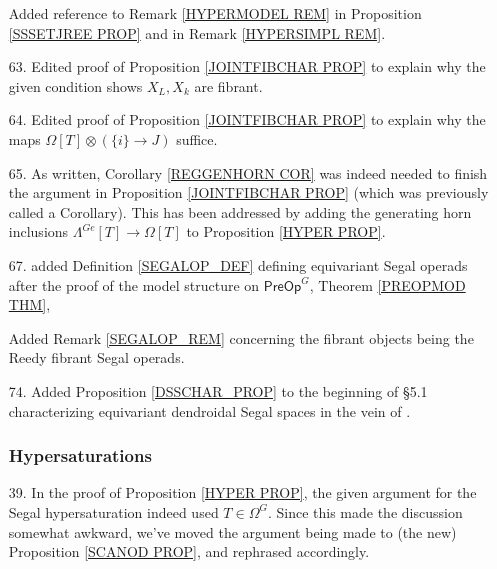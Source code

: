 \documentclass{article}
\begin{document}
\begin{itemize}
      Added reference to Remark \ref{HYPERMODEL REM} in Proposition \ref{SSSETJREE PROP} and in Remark \ref{HYPERSIMPL REM}.
      
\item[63.] Edited proof of Proposition \ref{JOINTFIBCHAR PROP} to explain why the given condition shows $X_L,X_k $ are fibrant.
      
\item[64.] Edited proof of Proposition \ref{JOINTFIBCHAR PROP} to explain why the maps $\Omega[T] \otimes (\{i\} \to J)$ suffice. %
      
\item[65.] As written, Corollary \ref{REGGENHORN COR} was indeed needed to finish the argument in Proposition \ref{JOINTFIBCHAR PROP} (which was previously called a Corollary). This has been addressed by adding the generating horn inclusions $\Lambda^{Ge}[T] \to \Omega[T]$ to Proposition \ref{HYPER PROP}. %
      
\item[67.] added Definition \ref{SEGALOP_DEF} defining equivariant Segal operads after the proof of the model structure on $\mathsf{PreOp}^G$, Theorem \ref{PREOPMOD THM},
      
      Added Remark \ref{SEGALOP_REM} concerning the fibrant objects being the Reedy fibrant Segal operads. %
      
\item[74.] Added Proposition \ref{DSSCHAR_PROP} to the beginning of \S 5.1 characterizing equivariant dendroidal Segal spaces in the vein of \cite[Cor. 5.6]{CM13a}. %



      
      \subsubsection*{Hypersaturations}
\item[39.] In the proof of Proposition \ref{HYPER PROP},
      the given argument for the Segal hypersaturation indeed used $T \in \Omega^G$. Since this made the discussion somewhat awkward, we've moved the argument being made to (the new) Proposition \ref{SCANOD PROP}, and rephrased accordingly. %
      

\end{itemize}
\end{document}
